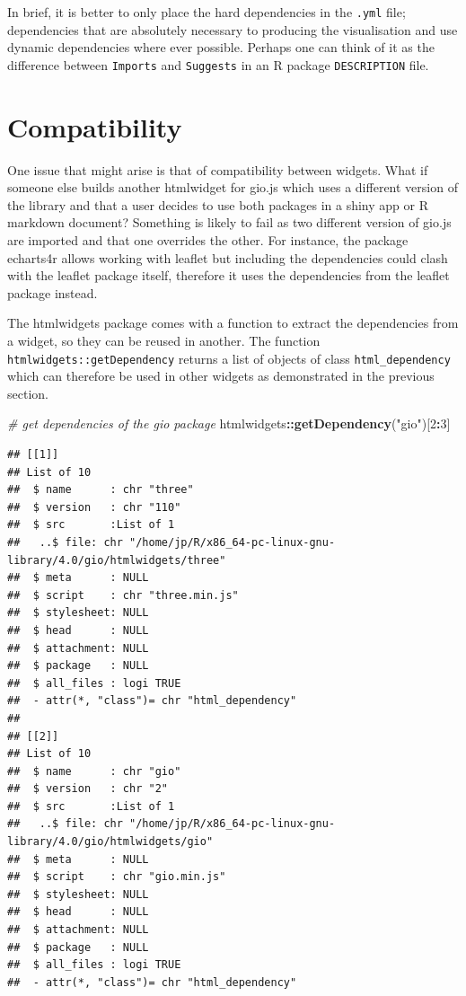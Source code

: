 \documentclass[
]{krantz}
\makeatletter
\newenvironment{Shaded}{\begin{snugshade}}{\end{snugshade}}
\newcommand{\CommentTok}[1]{\textcolor[rgb]{0.37,0.37,0.37}{\textit{#1}}}
\newcommand{\DecValTok}[1]{\textcolor[rgb]{0.06,0.06,0.06}{#1}}
\newcommand{\KeywordTok}[1]{\textcolor[rgb]{0.27,0.27,0.27}{\textbf{#1}}}
\newcommand{\NormalTok}[1]{#1}
\newcommand{\OperatorTok}[1]{\textcolor[rgb]{0.43,0.43,0.43}{\textbf{#1}}}
\newcommand{\StringTok}[1]{\textcolor[rgb]{0.5,0.5,0.5}{#1}}
\newenvironment{kframe}{%
\medskip{}
\setlength{\fboxsep}{.8em}
 \def\at@end@of@kframe{}%
 \ifinner\ifhmode%
  \def\at@end@of@kframe{\end{minipage}}%
  \begin{minipage}{\columnwidth}%
 \fi\fi%
 \def\FrameCommand##1{\hskip\@totalleftmargin \hskip-\fboxsep
 \colorbox{shadecolor}{##1}\hskip-\fboxsep
     \hskip-\linewidth \hskip-\@totalleftmargin \hskip\columnwidth}%
 \MakeFramed {\advance\hsize-\width
   \@totalleftmargin\z@ \linewidth\hsize
   \@setminipage}}%
 {\par\unskip\endMakeFramed%
 \at@end@of@kframe}
\renewenvironment{Shaded}{\begin{kframe}}{\end{kframe}}
\makeatother
\begin{document}
In brief, it is better to only place the hard dependencies in the \texttt{.yml} file; dependencies that are absolutely necessary to producing the visualisation and use dynamic dependencies where ever possible. Perhaps one can think of it as the difference between \texttt{Imports} and \texttt{Suggests} in an R package \texttt{DESCRIPTION} file.

\hypertarget{compatibility}{%
\section{Compatibility}\label{compatibility}}

One issue that might arise is that of compatibility between widgets. What if someone else builds another htmlwidget for gio.js which uses a different version of the library and that a user decides to use both packages in a shiny app or R markdown document? Something is likely to fail as two different version of gio.js are imported and that one overrides the other. For instance, the package echarts4r \citep{R-echarts4r} allows working with leaflet but including the dependencies could clash with the leaflet package itself, therefore it uses the dependencies from the leaflet package instead.

The htmlwidgets package comes with a function to extract the dependencies from a widget, so they can be reused in another. The function \texttt{htmlwidgets::getDependency} returns a list of objects of class \texttt{html\_dependency} which can therefore be used in other widgets as demonstrated in the previous section.

\begin{Shaded}
\begin{Highlighting}[]
\CommentTok{\# get dependencies of the gio package}
\NormalTok{htmlwidgets}\OperatorTok{::}\KeywordTok{getDependency}\NormalTok{(}\StringTok{"gio"}\NormalTok{)[}\DecValTok{2}\OperatorTok{:}\DecValTok{3}\NormalTok{]}
\end{Highlighting}
\end{Shaded}

\begin{verbatim}
## [[1]]
## List of 10
##  $ name      : chr "three"
##  $ version   : chr "110"
##  $ src       :List of 1
##   ..$ file: chr "/home/jp/R/x86_64-pc-linux-gnu-library/4.0/gio/htmlwidgets/three"
##  $ meta      : NULL
##  $ script    : chr "three.min.js"
##  $ stylesheet: NULL
##  $ head      : NULL
##  $ attachment: NULL
##  $ package   : NULL
##  $ all_files : logi TRUE
##  - attr(*, "class")= chr "html_dependency"
## 
## [[2]]
## List of 10
##  $ name      : chr "gio"
##  $ version   : chr "2"
##  $ src       :List of 1
##   ..$ file: chr "/home/jp/R/x86_64-pc-linux-gnu-library/4.0/gio/htmlwidgets/gio"
##  $ meta      : NULL
##  $ script    : chr "gio.min.js"
##  $ stylesheet: NULL
##  $ head      : NULL
##  $ attachment: NULL
##  $ package   : NULL
##  $ all_files : logi TRUE
##  - attr(*, "class")= chr "html_dependency"
\end{verbatim}
\end{document}
